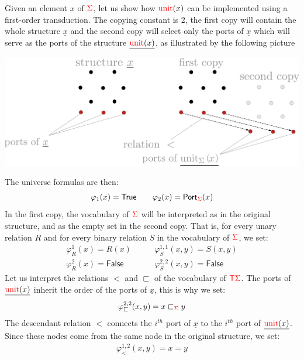     
   Given an element $x$ of ${\color{red}{\Sigma}}$, let us show how  ${\color{red}{\mathrm{unit}}}(x)$ can be implemented using a first-order transduction.  The copying constant is 2,
    the first copy will contain the whole structure $\underline{x}$ and the second copy will select only the ports of $\underline{x}$ which will serve as the ports of the structure $\underline{{\color{red}{\mathrm{unit}}}(x)}$, as illustrated by the following picture 
\begin{center}
    \includegraphics[scale=.18]{pictures/to-logic-unit.pdf}
    \end{center}    
      The universe formulas are then:
    \begin{align*}
    \varphi_1(x)=\mathsf{True} \qquad \varphi_2(x)=\mathsf{Port}_{\color{red}{\Sigma}}(x)
    \end{align*}
    In the first copy, the vocabulary of ${\color{red}{\Sigma}}$ will be interpreted as in the original structure, and as the empty set in the second copy. That is, for every unary relation $R$ and for every binary relation $S$ in the vocabulary of  ${\color{red}{\Sigma}}$, we set:
    \begin{align*}
   \varphi_R^{1}(x)=R(x) \quad&\quad \varphi_S^{1,1}(x,y)=S(x,y)\\
   \varphi_R^{2}(x)=\mathsf{False} \quad&\quad \varphi_S^{2,2}(x,y)=\mathsf{False}
\end{align*}      
Let us interpret the relations $<$ and $\sqsubset$ of the vocabulary of ${\color{red}{\mathsf T}}{\color{red}{\Sigma}}$. The  ports of $\underline{{\color{red}{\mathrm{unit}}}(x)}$ inherit the order of the ports of $\underline{x}$, this is why we set:
\begin{align*}
\varphi_\sqsubset^{2,2}(x,y)=x\sqsubset_{\color{red}{\Sigma}} y
\end{align*}
The descendant relation $<$ connects the $i^{th}$ port of $\underline{x}$ to the $i^{th}$ port of $\underline{{\color{red}{\mathrm{unit}}}(x)}$. Since these nodes come from the same node in the original structure, we set:
\begin{align*}
\varphi_<^{1,2}(x,y)=x=y
\end{align*}

